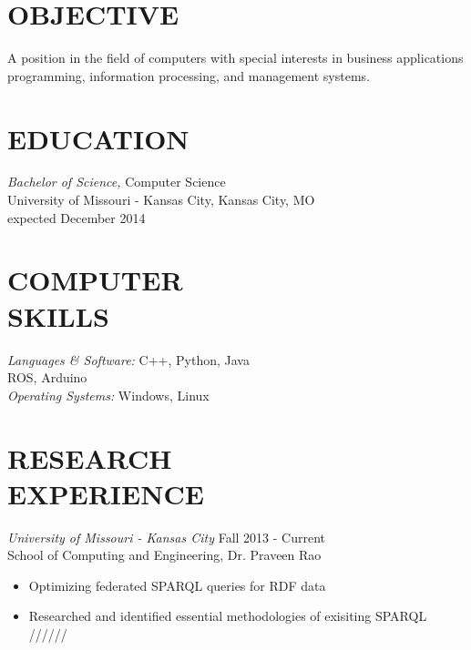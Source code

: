 \documentclass[line,margin]{res}
\begin{document}
\address{\hfill 11408 Colorado Ave \#12, Kansas City, MO 64137}
\address{\hfill (913)235-1070 \textbar \textbar \hspace{1 mm}  victoria.chen.wu@gmail.com}

 
\begin{resume}
 
\section{OBJECTIVE}       A position in the field of computers with special 
                interests in business applications programming, 
                information processing, and management systems. 
 
 
\section{EDUCATION} {\sl Bachelor of Science,} Computer Science\\
                University of Missouri - Kansas City, Kansas City, MO \\
                expected December 2014 

\section{COMPUTER \\ SKILLS} {\sl Languages \& Software:} 
		C++, Python, Java \\
		ROS, Arduino \\
                {\sl Operating Systems:} Windows, Linux 
\section {RESEARCH \\ EXPERIENCE}
		{\sl University of Missouri - Kansas City} \hfill Fall 2013 - Current \\
		School of Computing and Engineering, Dr. Praveen Rao
		 \begin{itemize}  \itemsep -2pt %
		 \item  Optimizing federated SPARQL queries for RDF data
		\item   Researched and identified essential methodologies of exisiting SPARQL ////// 
		\end{itemize}



\end{resume}
\end{document}
